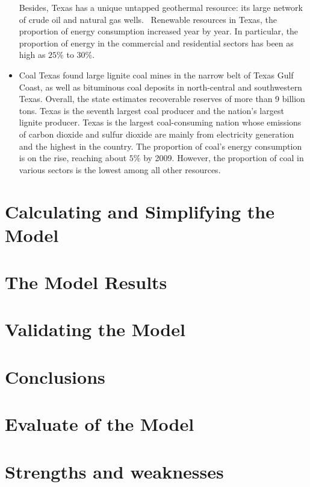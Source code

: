 \documentclass{mcmthesis}
\begin{document}
\begin{itemize}
  Besides, Texas has a unique untapped geothermal resource: its large network of crude oil and natural gas wells. 
  Renewable resources in Texas, the proportion of energy consumption increased year by year.
  In particular, the proportion of energy in the commercial and residential sectors has been as high as $25\%$ to $30\%$.
  \item Coal
  Texas found large lignite coal mines in the narrow belt of Texas Gulf Coast, as well as bituminous coal deposits in north-central
  and southwestern Texas. Overall, the state estimates recoverable reserves of more than 9 billion tons.
  Texas is the seventh largest coal producer and the nation's largest lignite producer. Texas is the largest coal-consuming nation
  whose emissions of carbon dioxide and sulfur dioxide are mainly from electricity generation and the highest in the country.
  The proportion of coal's energy consumption is on the rise, reaching about $5\%$ by 2009. However, the proportion of coal in
  various sectors is the lowest among all other resources.
\end{itemize}

\section{Calculating and Simplifying the Model }
\section{The Model Results}
\section{Validating the Model}
\section{Conclusions}
\section{Evaluate of the Model}
\section{Strengths and weaknesses}
\end{document}
